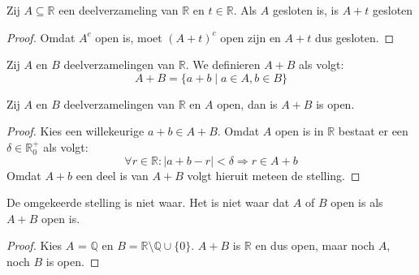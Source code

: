 \documentclass[main.tex]{subfiles}
\begin{document}
\begin{st}
  Zij $A \subseteq \mathbb{R}$ een deelverzameling van $\mathbb{R}$ en $t\in \mathbb{R}$.
  Als $A$ gesloten is, is $A+t$ gesloten

  \begin{proof} 
    Omdat $A^{c}$ open is, moet $(A+t)^{c}$ open zijn en $ A+t$ dus gesloten.
  \end{proof}
\feed
\end{st}

\begin{de}
  Zij $A$ en $B$ deelverzamelingen van $\mathbb{R}$.
  We definieren $A+B$ als volgt:
  \[ A+B = \{ a+b \mid a\in A, b\in B \} \]
\end{de}

\begin{st}
  Zij $A$ en $B$ deelverzamelingen van $\mathbb{R}$ en $A$ open, dan is $A+B$ is open.
  
  \begin{proof}
    Kies een willekeurige $a+b \in A+B$.
    Omdat $A$ open is in $\mathbb{R}$ bestaat er een $\delta\in \mathbb{R}_{0}^{+}$ als volgt:
    \[ \forall r \in \mathbb{R}: |a+b-r| < \delta \Rightarrow r \in A+b \]
    Omdat $A+b$ een deel is van $A+B$ volgt hieruit meteen de stelling.
  \end{proof}
\feed
\end{st}

\begin{tvb}
  De omgekeerde stelling is niet waar.
  Het is niet waar dat $A$ of $B$ open is als $A+B$ open is.

  \begin{proof}
    Kies $A$ = $\mathbb{Q}$ en $B= \mathbb{R}\setminus \mathbb{Q} \cup \{0\}$.
    $A+B$ is $\mathbb{R}$ en dus open, maar noch $A$, noch $B$ is open. \needed
  \end{proof}
\feed
\end{tvb}
 
\end{document}
